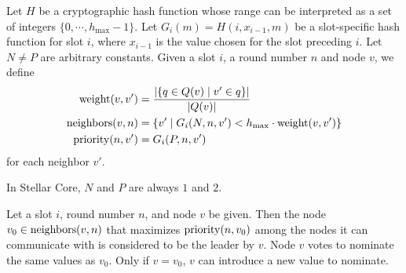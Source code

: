 \begin{defn}
    Let $H$ be a cryptographic hash function whose range can be interpreted as a set of integers $\{ 0, \cdots, h_{\max} - 1 \}$.
    Let $G_i(m) = H(i, x_{i - 1}, m)$ be a slot-specific hash function for slot $i$, where $x_{i - 1}$ is the value chosen for the slot preceding $i$.
    Let $N \ne P$ are arbitrary constants.
    Given a slot $i$, a round number $n$ and node $v$, we define
    \begin{align*}
        \operatorname{weight}(v, v') &= \frac{\abs{\{ q \in Q(v) \mid v' \in q \}}}{\abs{Q(v)}} \\
        \operatorname{neighbors}(v, n) &= \{ v' \mid G_i(N, n, v') < h_{\max} \cdot \operatorname{weight}(v, v') \} \\
        \operatorname{priority}(n, v') &= G_i(P, n, v')
    \end{align*}
    for each neighbor $v'$.
\end{defn}

\begin{rem}
    In Stellar Core, $N$ and $P$ are always $1$ and $2$.
\end{rem}

\begin{defn}[Leader]
    Let a slot $i$, round number $n$, and node $v$ be given.
    Then the node $v_0 \in \operatorname{neighbors}(v, n)$ that maximizes $\operatorname{priority}(n, v_0)$ among the nodes it can communicate with is considered to be the leader by $v$.
    Node $v$ votes to nominate the same values as $v_0$.
    Only if $v = v_0$, $v$ can introduce a new value to nominate.
\end{defn}


